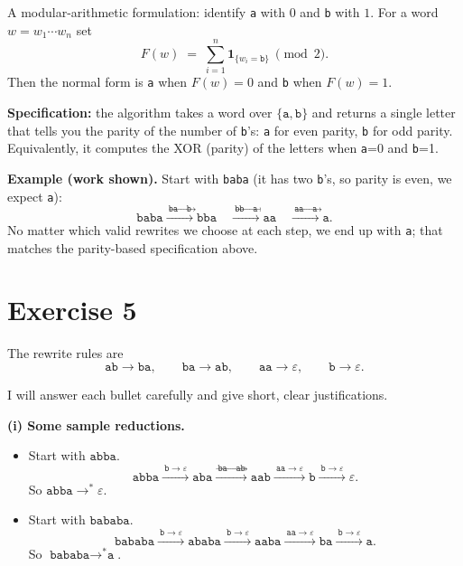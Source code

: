 \documentclass{article}
\theoremstyle{plain}
\theoremstyle{definition}
\theoremstyle{remark}
\begin{document}
\begin{enumerate}[label=(\alph*)]
  A modular-arithmetic formulation: identify \texttt{a} with $0$ and \texttt{b} with $1$. For a word $w=w_1\cdots w_n$ set
  \[
    F(w)\;=\;\sum_{i=1}^n \mathbf{1}_{\{w_i=\texttt{b}\}}\ \pmod{2}.
  \]
  Then the normal form is \texttt{a} when $F(w)=0$ and \texttt{b} when $F(w)=1$.
  
  \textbf{Specification:} the algorithm takes a word over $\{\texttt{a},\texttt{b}\}$ and returns a single letter that tells you the parity of the number of \texttt{b}'s: \texttt{a} for even parity, \texttt{b} for odd parity. Equivalently, it computes the XOR (parity) of the letters when \texttt{a}=0 and \texttt{b}=1.
\end{enumerate}

\bigskip

\textbf{Example (work shown).} Start with \texttt{baba} (it has two \texttt{b}'s, so parity is even, we expect \texttt{a}):
\[
\texttt{baba} \xrightarrow{\ \texttt{ba}\to\texttt{b}\ } \texttt{bba}
\quad\xrightarrow{\ \texttt{bb}\to\texttt{a}\ } \texttt{aa}
\quad\xrightarrow{\ \texttt{aa}\to\texttt{a}\ } \texttt{a}.
\]
No matter which valid rewrites we choose at each step, we end up with \texttt{a}; that matches the parity-based specification above.

\section{Exercise 5}

The rewrite rules are
\[
\texttt{ab}\longrightarrow\texttt{ba},\qquad
\texttt{ba}\longrightarrow\texttt{ab},\qquad
\texttt{aa}\longrightarrow\varepsilon,\qquad
\texttt{b}\longrightarrow\varepsilon.
\]

I will answer each bullet carefully and give short, clear justifications.

\medskip

\textbf{(i) Some sample reductions.}

\begin{itemize}
  \item Start with \(\texttt{abba}\).
  \[
    \texttt{abba}\xrightarrow{\ \texttt{b}\to\varepsilon\ } \texttt{aba}
    \xrightarrow{\ \texttt{ba}\to\texttt{ab}\ } \texttt{aab}
    \xrightarrow{\ \texttt{aa}\to\varepsilon\ } \texttt{b}
    \xrightarrow{\ \texttt{b}\to\varepsilon\ }\varepsilon.
  \]
  So \(\texttt{abba}\to^{*}\varepsilon\).
  \item Start with \(\texttt{bababa}\).
  \[
    \texttt{bababa}\xrightarrow{\ \texttt{b}\to\varepsilon\ } \texttt{ababa}
    \xrightarrow{\ \texttt{b}\to\varepsilon\ } \texttt{aaba}
    \xrightarrow{\ \texttt{aa}\to\varepsilon\ } \texttt{ba}
    \xrightarrow{\ \texttt{b}\to\varepsilon\ } \texttt{a}.
  \]
  So \(\texttt{bababa}\to^{*}\texttt{a}\).
\end{itemize}
\end{document}
